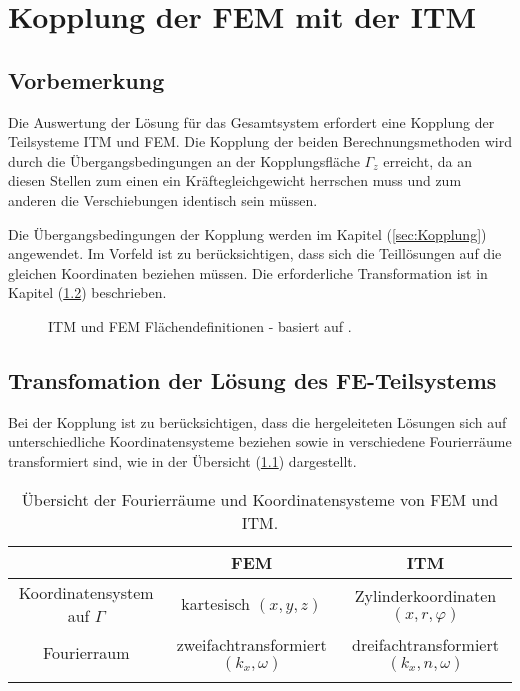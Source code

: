 \chapter{Kopplung der FEM mit der ITM}
\label{cha:Kopplung}

\section{Vorbemerkung}
\label{sec:Vorbem_Kopplung}

Die Auswertung der Lösung für das Gesamtsystem erfordert eine Kopplung der Teilsysteme ITM und FEM.
Die Kopplung der beiden Berechnungsmethoden wird durch die Übergangsbedingungen an der Kopplungsfläche $\Gamma_z$ erreicht, da an diesen Stellen zum einen ein Kräftegleichgewicht herrschen muss und zum anderen die Verschiebungen identisch sein müssen.

Die Übergangsbedingungen der Kopplung werden im Kapitel (\ref{sec:Kopplung}) angewendet. Im Vorfeld ist zu berücksichtigen, dass sich die Teillösungen auf die gleichen Koordinaten beziehen müssen. 
Die erforderliche Transformation ist in Kapitel (\ref{sec:Transformation_Kopplung}) beschrieben.
\begin{figure}[H]
	\hspace*{37mm}
	
	\caption{ITM und FEM Flächendefinitionen - basiert auf \citep{Freisinger2022}.}
	\label{fig:Kopplung}
\end{figure}

\section{Transfomation der Lösung des FE-Teilsystems}
\label{sec:Transformation_Kopplung}
Bei der Kopplung ist zu berücksichtigen, dass die hergeleiteten Lösungen sich auf unterschiedliche Koordinatensysteme beziehen sowie in verschiedene Fourierräume transformiert sind, wie in der Übersicht (\ref{tab:Übersichtstabelle}) dargestellt.
\begin{table}[htb]
	\centering
	\normalsize
	\begin{tabular}{ccc}
		& \textbf{FEM} & \textbf{ITM} \\\hline
		Koordinatensystem auf $\Gamma$ & kartesisch $(x,y,z)$ & Zylinderkoordinaten $(x,r,\varphi)$ \\
		Fourierraum                     & zweifachtransformiert $(k_x,\omega)$        & dreifachtransformiert$(k_x,n,\omega)$ \\\lasthline
	\end{tabular}
	\caption{Übersicht der Fourierräume und Koordinatensysteme von FEM und ITM.}
	\label{tab:Übersichtstabelle}
\end{table}\\

